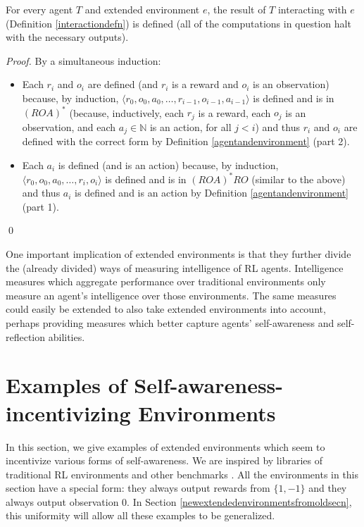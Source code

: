 \documentclass[runningheads]{llncs}
\begin{document}
\begin{lemma}
    For every agent $T$ and extended environment $e$, the result of $T$ interacting
    with $e$ (Definition \ref{interactiondefn}) is defined (all of the computations
    in question halt with the necessary outputs).
\end{lemma}

\begin{proof}
    By a simultaneous induction:
    \begin{itemize}
        \item
        Each $r_i$ and $o_i$ are defined (and $r_i$ is a reward
        and $o_i$ is an observation) because, by induction,
        $\langle r_0,o_0,a_0,\ldots,r_{i-1},o_{i-1},a_{i-1}\rangle$
        is defined and is in $(ROA)^*$ (because, inductively,
        each $r_j$ is a reward, each $o_j$ is an observation,
        and each $a_j\in\mathbb N$ is an action, for all $j<i$)
        and thus $r_i$ and $o_i$ are defined with the correct form by
        Definition \ref{agentandenvironment} (part 2).
        \item
        Each $a_i$ is defined (and is an action) because, by induction,
        $\langle r_0,o_0,a_0,\ldots,r_i,o_i\rangle$
        is defined and is in $(ROA)^*RO$ (similar to the above) and thus
        $a_i$ is defined and is an action by Definition
        \ref{agentandenvironment} (part 1).
    \end{itemize}
    \qed
\end{proof}

One important implication of extended environments is that they further divide
the (already divided) ways of measuring intelligence of RL agents. Intelligence
measures
\cite{alexander2019intelligence} \cite{hernandez} \cite{legg2007universal}
which aggregate performance over traditional environments only measure
an agent's intelligence over those environments. The same measures could easily
be extended to also take extended environments into account, perhaps providing
measures which better capture agents' self-awareness and self-reflection abilities.

\section{Examples of Self-awareness-incentivizing Environments}
\label{basicexamplessection}

In this section, we give examples of extended environments which seem
to incentivize various forms of self-awareness. We are inspired by libraries of
traditional RL environments and other benchmarks \cite{bellemare2013arcade}
\cite{beyret2019animal} \cite{brockman2016openai} \cite{chollet2019measure}
\cite{cobbe2020leveraging}. All the environments in this section have a special
form: they always output rewards from $\{1,-1\}$ and they always output observation $0$.
In Section \ref{newextendedenvironmentsfromoldsecn},
this uniformity will allow all these examples to be generalized.
\end{document}
